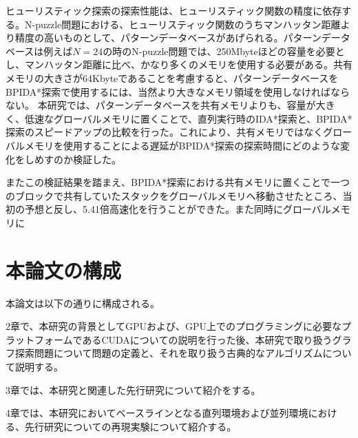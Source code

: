 \documentclass[a4paper,11pt,oneside,openany]{jsbook}
\begin{document}
ヒューリスティック探索の探索性能は、ヒューリスティック関数の精度に依存する。N-puzzle問題における、ヒューリスティック関数のうちマンハッタン距離より精度の高いものとして、パターンデータベースがあげられる。パターンデータベースは例えば$N=24$の時のN-puzzle問題では、250Mbyteほどの容量を必要とし、マンハッタン距離に比べ、かなり多くのメモリを使用する必要がある。共有メモリの大きさが64Kbyteであることを考慮すると、パターンデータベースをBPIDA*探索で使用するには、当然より大きなメモリ領域を使用しなければならない。
本研究では、パターンデータベースを共有メモリよりも、容量が大きく、低速なグローバルメモリに置くことで、直列実行時のIDA*探索と、BPIDA*探索のスピードアップの比較を行った。これにより、共有メモリではなくグローバルメモリを使用することによる遅延がBPIDA*探索の探索時間にどのような変化をしめすのか検証した。

またこの検証結果を踏まえ、BPIDA*探索における共有メモリに置くことで一つのブロックで共有していたスタックをグローバルメモリへ移動させたところ、当初の予想と反し、5.41倍高速化を行うことができた。また同時にグローバルメモリに





\section{本論文の構成}
本論文は以下の通りに構成される。

2章で、本研究の背景としてGPUおよび、GPU上でのプログラミングに必要なプラットフォームであるCUDAについての説明を行った後、本研究で取り扱うグラフ探索問題について問題の定義と、それを取り扱う古典的なアルゴリズムについて説明する。

3章では、本研究と関連した先行研究について紹介をする。

4章では、本研究においてベースラインとなる直列環境および並列環境における、先行研究についての再現実験について紹介する。
\end{document}
